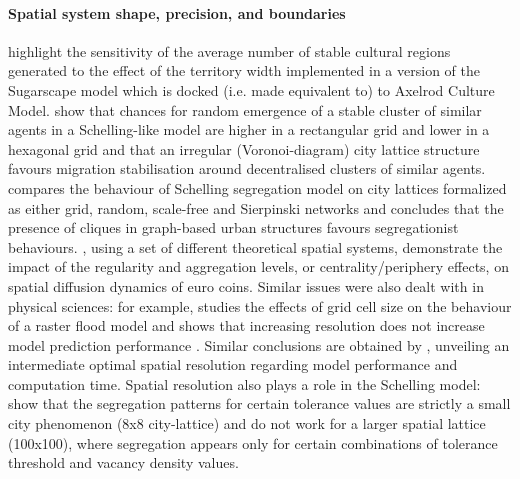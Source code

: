 \documentclass[preprint,5p,times,twocolumn,authoryear]{elsarticle}
\begin{document}
\paragraph{Spatial system shape, precision, and boundaries} \citet{Axtelletal1996} highlight the sensitivity of the average number of stable cultural regions generated to the effect of the territory width implemented in a version of the Sugarscape model which is docked (i.e. made equivalent to) to Axelrod Culture Model. \citet{FlacheHegselmann2001} show that chances for random emergence of a stable cluster of similar agents in a Schelling-like model are higher in a rectangular grid and lower in a hexagonal grid and that an irregular (Voronoi-diagram) city lattice structure favours migration stabilisation around decentralised clusters of similar agents. \citet{Banos2012} compares the behaviour of Schelling segregation model on city lattices formalized as either grid, random, scale-free and Sierpinski networks and concludes that the presence of cliques in graph-based urban structures favours segregationist behaviours. \citet{LeTexierCaruso2017}, using a set of different theoretical spatial systems, demonstrate the impact of the regularity and aggregation levels, or centrality/periphery effects, on spatial diffusion dynamics of euro coins. Similar issues were also dealt with in physical sciences: for example, \cite{horritt2001effects} studies the effects of grid cell size on the behaviour of a raster flood model and shows that increasing resolution does not increase model prediction performance . Similar conclusions are obtained by \cite{vazquez2002effect}, unveiling an intermediate optimal spatial resolution regarding model performance and computation time. Spatial resolution also plays a role in the Schelling model: \citet{Singhetal2009} show that the segregation patterns for certain tolerance values are strictly a small city phenomenon (8x8 city-lattice) and do not work for a larger spatial lattice (100x100), where segregation appears only for certain combinations of tolerance threshold and vacancy density values.
\end{document}
